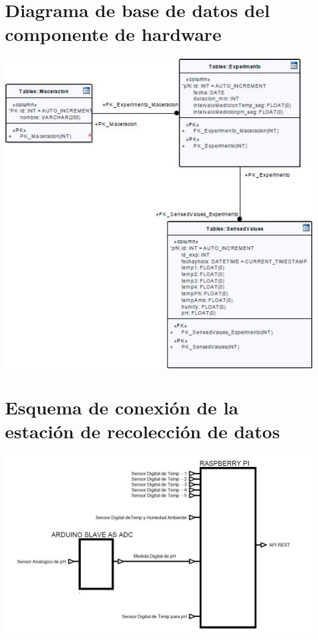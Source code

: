     \begin{minipage}{0.95\textwidth}
    \chapter{Diagrama de base de datos del componente de hardware}
        \centering
        \includegraphics[scale=1]{diagramaBD-Rasp.jpg}
        \label{fig:DiagramaBdRasp}
    
    \end{minipage}
    
    \begin{minipage}{0.95\textwidth}
    \chapter{Esquema de conexión de la estación de recolección de datos}
        \centering
        \includegraphics[scale=0.55]{EsquemaHardware.jpg}
        \label{fig:EsquemaHardware}
    \end{minipage}
    
